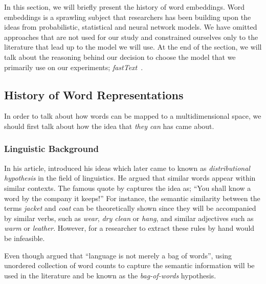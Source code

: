 In this section, we will briefly present the history of word embeddings.
Word embeddings is a sprawling subject that researchers has been building upon the ideas from probabilistic, statistical and neural network models.
We have omitted approaches that are not used for our study and constrained ourselves only to the literature that lead up to the model we will use. %
At the end of the section, we will talk about the reasoning behind our decision to choose the model that we primarily use on our experiments; \emph{fastText}~\cite{mikolov2018advances}.

\subsection{History of Word Representations}%
\label{sub:history_of_word_representations}

In order to talk about how words can be mapped to a multidimensional space, we should first talk about how the idea that \emph{they can} has came about.

\subsubsection{Linguistic Background}%
\label{ssub:linguistic_background}

In his \citeyear{harris_distributional_1954} article, \textcite{harris_distributional_1954} introduced his ideas which later came to known as \emph{distributional hypothesis} in the field of linguistics.
He argued that similar words appear within similar contexts.
The famous quote by \textcite{firth_synopsis_1957} captures the idea as;
\enquote{You shall know a word by the company it keeps!}
For instance, the semantic similarity between the terms \emph{jacket} and \emph{coat} can be theoretically shown since they will be accompanied by similar verbs, such as \emph{wear}, \emph{dry clean} or \emph{hang}, and similar adjectives such as \emph{warm} or \emph{leather}.
However, for a researcher to extract these rules by hand would be infeasible.

Even though \citeauthor{harris_distributional_1954} argued that \enquote{language is not merely a bag of words}, using unordered collection of word counts to capture the semantic information will be used in the literature and be known as the \emph{bag-of-words} hypothesis.

